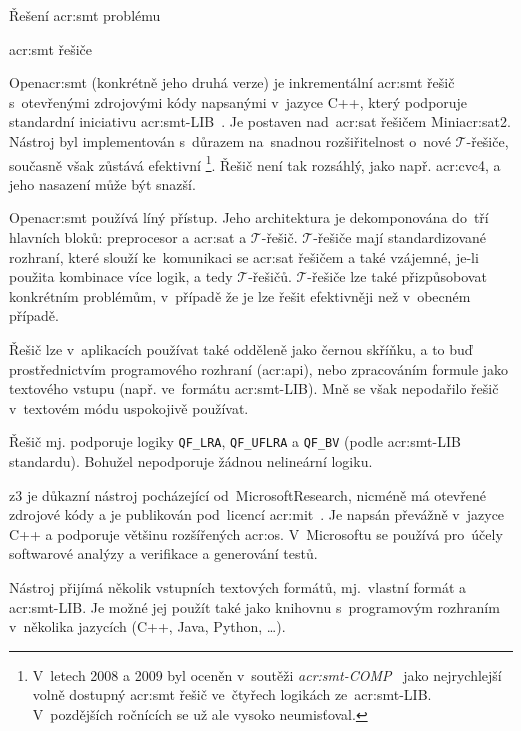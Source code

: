 \documentclass[thesis=M,czech]{FITthesis}[2012/06/26]
\newcommand{\acrlabel}[1]{acr:#1}
\newcommand{\acr}[1]{\acrshort{\acrlabel{#1}}}
\newcommand{\id}[1]{\texttt{#1}}
\newcommand{\hl}[1]{\textit{#1}}
\newcommand{\name}[1]{\hl{#1}}
\newcommand{\cit}[1]{\cite{#1}}
\newcommand{\reg}{\textsuperscript{\textregistered}}
\newcommand{\set}[1]{\ensuremath{\mathcal{#1}}}
\begin{document}
\begin{section}{Řešení \acr{smt} problému}
\begin{subsection}{\acr{smt} řešiče}

\begin{paragraph}{Open\acr{smt}}\label{p:search:smt:solver:opensmt}
(konkrétně jeho druhá verze)
je inkrementální \acr{smt} řešič
s~otevřenými zdrojovými kódy
napsanými v~jazyce C++,
který podporuje standardní iniciativu
\acr{smt}-LIB~\cit{opensmt}\cit{opensmt-art}.
Je postaven
nad~\acr{sat} řešičem Mini\acr{sat}2.
Nástroj byl implementován
s~důrazem na~snadnou rozšiřitelnost o~nové \set{T}-řešiče,
současně však zůstává efektivní%
\footnote{V~letech 2008 a 2009
byl oceněn v~soutěži
\name{\acr{smt}-COMP}~\cit{smtcomp}\cit{smtcomp-art}
jako nejrychlejší volně dostupný \acr{smt} řešič
ve~čtyřech logikách ze~\acr{smt}-LIB.
V~pozdějších ročnících se už ale vysoko neumisťoval.}.
Řešič není tak rozsáhlý,
jako např. \acr{cvc}4,
a jeho nasazení může být snazší.

Open\acr{smt} používá líný přístup.
Jeho architektura je dekomponována do~tří hlavních bloků:
preprocesor a \acr{sat} a \set{T}-řešič.
\set{T}-řešiče mají standardizované rozhraní,
které slouží ke~komunikaci se \acr{sat} řešičem a také vzájemné,
je-li použita kombinace více logik, a tedy \set{T}-řešičů.
\set{T}-řešiče lze také přizpůsobovat
konkrétním problémům,
v~případě že je lze řešit efektivněji než v~obecném případě.

Řešič lze v~aplikacích používat také odděleně
jako černou skříňku,
a to buď prostřednictvím programového rozhraní (\acr{api}),
nebo zpracováním formule jako textového vstupu
(např. ve~formátu \acr{smt}-LIB).
Mně se však nepodařilo řešič v~textovém módu uspokojivě používat.

Řešič mj. podporuje logiky
\id{QF\_\-LRA}, \id{QF\_\-UFLRA} a \id{QF\_\-BV}
(podle \acr{smt}-LIB standardu).
Bohužel nepodporuje žádnou nelineární logiku.
\end{paragraph} %


\begin{paragraph}{z3}\label{p:search:smt:solver:z3}
je důkazní nástroj pocházející od~Microsoft\reg Research,
nicméně má otevřené zdrojové kódy
a je publikován pod~licencí \acr{mit}~\cit{z3-art}\cit{z3}.
Je napsán převážně v~jazyce C++
a podporuje většinu rozšířených \acr{os}.
V~Microsoftu se používá
pro~účely softwarové analýzy a verifikace
a generování testů.

Nástroj přijímá několik vstupních textových formátů,
mj.~vlastní formát a \acr{smt}-LIB.
Je možné jej použít také jako knihovnu
s~programovým rozhraním
v~několika jazycích (C++, Java, Python, \dots).


\end{paragraph}
\end{subsection}
\end{section}
\end{document}
